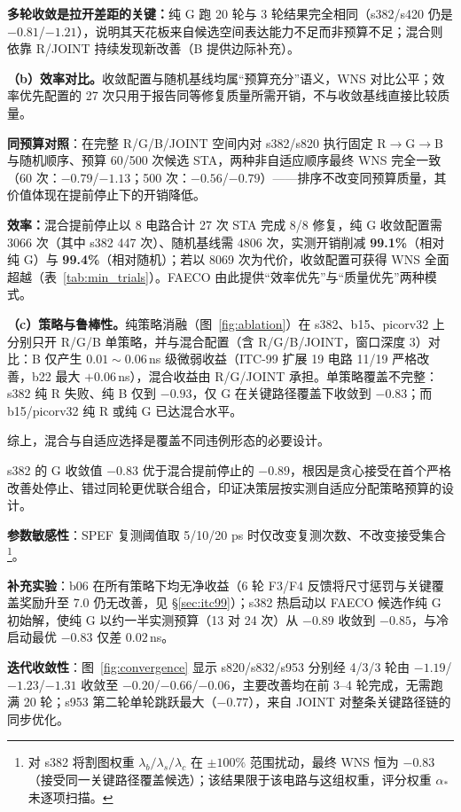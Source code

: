 \documentclass[journal]{IEEEtran}
\begin{document}
\textbf{多轮收敛是拉开差距的关键：}纯 G 跑 20 轮与 3 轮结果完全相同（s382/s420 仍是 $-0.81$/$-1.21$），说明其天花板来自候选空间表达能力不足而非预算不足；混合则依靠 R/JOINT 持续发现新改善（B 提供边际补充）。

\textbf{（b）效率对比。}收敛配置与随机基线均属“预算充分”语义，WNS 对比公平；效率优先配置的 27 次只用于报告同等修复质量所需开销，不与收敛基线直接比较质量。

\textbf{同预算对照}：在完整 R/G/B/JOINT 空间内对 s382/s820 执行固定 R$\rightarrow$G$\rightarrow$B 与随机顺序、预算 60/500 次候选 STA，两种非自适应顺序最终 WNS 完全一致（60 次：$-0.79$/$-1.13$；500 次：$-0.56$/$-0.79$）——排序不改变同预算质量，其价值体现在提前停止下的开销降低。

\textbf{效率：}混合提前停止以 8 电路合计 27 次 STA 完成 8/8 修复，纯 G 收敛配置需 3066 次（其中 s382 447 次）、随机基线需 4806 次，实测开销削减 \textbf{99.1\%}（相对纯 G）与 \textbf{99.4\%}（相对随机）；若以 8069 次为代价，收敛配置可获得 WNS 全面超越（表~\ref{tab:min_trials}）。FAECO 由此提供“效率优先”与“质量优先”两种模式。

\textbf{（c）策略与鲁棒性。}纯策略消融（图~\ref{fig:ablation}）在 s382、b15、picorv32 上分别只开 R/G/B 单策略，并与混合配置（含 R/G/B/JOINT，窗口深度 3）对比：B 仅产生 $0.01\!\sim\!0.06\,$ns 级微弱收益（ITC-99 扩展 19 电路 11/19 严格改善，b22 最大 $+0.06\,$ns），混合收益由 R/G/JOINT 承担。单策略覆盖不完整：s382 纯 R 失败、纯 B 仅到 $-0.93$，仅 G 在关键路径覆盖下收敛到 $-0.83$；而 b15/picorv32 纯 R 或纯 G 已达混合水平。

综上，混合与自适应选择是覆盖不同违例形态的必要设计。

s382 的 G 收敛值 $-0.83$ 优于混合提前停止的 $-0.89$，根因是贪心接受在首个严格改善处停止、错过同轮更优联合组合，印证决策层按实测自适应分配策略预算的设计。

\textbf{参数敏感性}：SPEF 复测阈值取 5/10/20 ps 时仅改变复测次数、不改变接受集合\footnote{对 s382 将割图权重 $\lambda_b/\lambda_s/\lambda_c$ 在 $\pm 100\%$ 范围扰动，最终 WNS 恒为 $-0.83$（接受同一关键路径覆盖候选）；该结果限于该电路与这组权重，评分权重 $\alpha_*$ 未逐项扫描。}。

\textbf{补充实验}：b06 在所有策略下均无净收益（6 轮 F3/F4 反馈将尺寸惩罚与关键覆盖奖励升至 $7.0$ 仍无改善，见 \S\ref{sec:itc99}）；s382 热启动以 FAECO 候选作纯 G 初始解，使纯 G 以约一半实测预算（13 对 24 次）从 $-0.89$ 收敛到 $-0.85$，与冷启动最优 $-0.83$ 仅差 $0.02\,$ns。

\textbf{迭代收敛性}：图~\ref{fig:convergence} 显示 s820/s832/s953 分别经 4/3/3 轮由 $-1.19$/$-1.23$/$-1.31$ 收敛至 $-0.20$/$-0.66$/$-0.06$，主要改善均在前 3--4 轮完成，无需跑满 20 轮；s953 第二轮单轮跳跃最大（$-0.77$），来自 JOINT 对整条关键路径链的同步优化。
\end{document}
